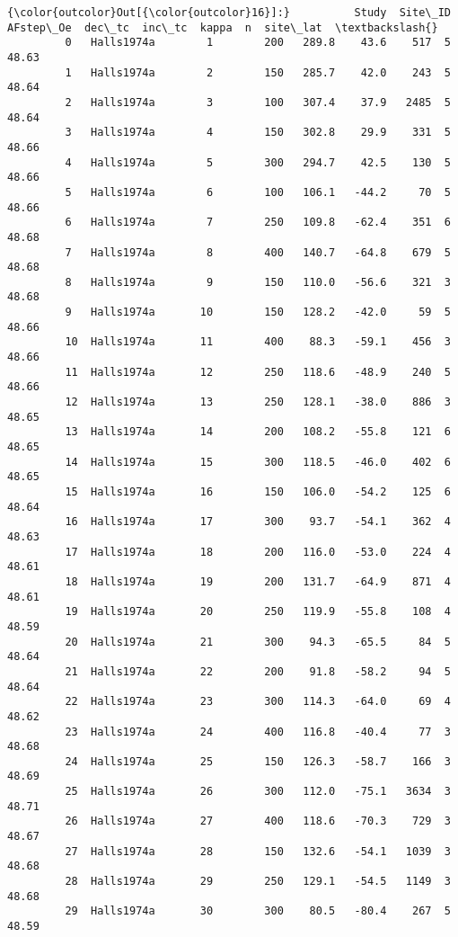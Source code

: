 \documentclass{article}
\begin{document}
            \begin{Verbatim}[commandchars=\\\{\}]
{\color{outcolor}Out[{\color{outcolor}16}]:}          Study  Site\_ID  AFstep\_Oe  dec\_tc  inc\_tc  kappa  n  site\_lat  \textbackslash{}
         0   Halls1974a        1        200   289.8    43.6    517  5     48.63   
         1   Halls1974a        2        150   285.7    42.0    243  5     48.64   
         2   Halls1974a        3        100   307.4    37.9   2485  5     48.64   
         3   Halls1974a        4        150   302.8    29.9    331  5     48.66   
         4   Halls1974a        5        300   294.7    42.5    130  5     48.66   
         5   Halls1974a        6        100   106.1   -44.2     70  5     48.66   
         6   Halls1974a        7        250   109.8   -62.4    351  6     48.68   
         7   Halls1974a        8        400   140.7   -64.8    679  5     48.68   
         8   Halls1974a        9        150   110.0   -56.6    321  3     48.68   
         9   Halls1974a       10        150   128.2   -42.0     59  5     48.66   
         10  Halls1974a       11        400    88.3   -59.1    456  3     48.66   
         11  Halls1974a       12        250   118.6   -48.9    240  5     48.66   
         12  Halls1974a       13        250   128.1   -38.0    886  3     48.65   
         13  Halls1974a       14        200   108.2   -55.8    121  6     48.65   
         14  Halls1974a       15        300   118.5   -46.0    402  6     48.65   
         15  Halls1974a       16        150   106.0   -54.2    125  6     48.64   
         16  Halls1974a       17        300    93.7   -54.1    362  4     48.63   
         17  Halls1974a       18        200   116.0   -53.0    224  4     48.61   
         18  Halls1974a       19        200   131.7   -64.9    871  4     48.61   
         19  Halls1974a       20        250   119.9   -55.8    108  4     48.59   
         20  Halls1974a       21        300    94.3   -65.5     84  5     48.64   
         21  Halls1974a       22        200    91.8   -58.2     94  5     48.64   
         22  Halls1974a       23        300   114.3   -64.0     69  4     48.62   
         23  Halls1974a       24        400   116.8   -40.4     77  3     48.68   
         24  Halls1974a       25        150   126.3   -58.7    166  3     48.69   
         25  Halls1974a       26        300   112.0   -75.1   3634  3     48.71   
         26  Halls1974a       27        400   118.6   -70.3    729  3     48.67   
         27  Halls1974a       28        150   132.6   -54.1   1039  3     48.68   
         28  Halls1974a       29        250   129.1   -54.5   1149  3     48.68   
         29  Halls1974a       30        300    80.5   -80.4    267  5     48.59   
         

\end{Verbatim}
\end{document}
